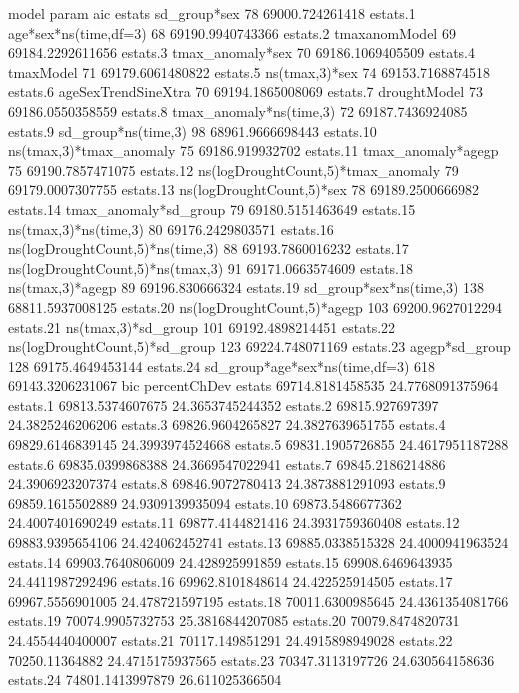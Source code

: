 \documentclass[a4paper]{article}                %
\begin{document}
\begin{Schunk}
\begin{Soutput}
                                       model param              aic
estats                          sd_group*sex    78  69000.724261418
estats.1               age*sex*ns(time,df=3)    68 69190.9940743366
estats.2                       tmaxanomModel    69 69184.2292611656
estats.3                    tmax_anomaly*sex    70 69186.1069405509
estats.4                           tmaxModel    71 69179.6061480822
estats.5                      ns(tmax,3)*sex    74 69153.7168874518
estats.6                 ageSexTrendSineXtra    70 69194.1865008069
estats.7                        droughtModel    73 69186.0550358559
estats.8             tmax_anomaly*ns(time,3)    72 69187.7436924085
estats.9                 sd_group*ns(time,3)    98 68961.9666698443
estats.10            ns(tmax,3)*tmax_anomaly    75  69186.919932702
estats.11                 tmax_anomaly*agegp    75 69190.7857471075
estats.12 ns(logDroughtCount,5)*tmax_anomaly    79 69179.0007307755
estats.13          ns(logDroughtCount,5)*sex    78 69189.2500666982
estats.14              tmax_anomaly*sd_group    79 69180.5151463649
estats.15              ns(tmax,3)*ns(time,3)    80 69176.2429803571
estats.16   ns(logDroughtCount,5)*ns(time,3)    88 69193.7860016232
estats.17   ns(logDroughtCount,5)*ns(tmax,3)    91 69171.0663574609
estats.18                   ns(tmax,3)*agegp    89  69196.830666324
estats.19            sd_group*sex*ns(time,3)   138 68811.5937008125
estats.20        ns(logDroughtCount,5)*agegp   103 69200.9627012294
estats.21                ns(tmax,3)*sd_group   101 69192.4898214451
estats.22     ns(logDroughtCount,5)*sd_group   123  69224.748071169
estats.23                     agegp*sd_group   128 69175.4649453144
estats.24     sd_group*age*sex*ns(time,df=3)   618 69143.3206231067
                       bic     percentChDev
estats    69714.8181458535 24.7768091375964
estats.1  69813.5374607675 24.3653745244352
estats.2   69815.927697397 24.3825246206206
estats.3  69826.9604265827 24.3827639651755
estats.4  69829.6146839145 24.3993974524668
estats.5  69831.1905726855 24.4617951187288
estats.6  69835.0399868388 24.3669547022941
estats.7  69845.2186214886 24.3906923207374
estats.8  69846.9072780413 24.3873881291093
estats.9  69859.1615502889 24.9309139935094
estats.10 69873.5486677362 24.4007401690249
estats.11 69877.4144821416 24.3931759360408
estats.12 69883.9395654106  24.424062452741
estats.13 69885.0338515328 24.4000941963524
estats.14 69903.7640806009  24.428925991859
estats.15 69908.6469643935 24.4411987292496
estats.16 69962.8101848614  24.422525914505
estats.17 69967.5556901005  24.478721597195
estats.18 70011.6300985645 24.4361354081766
estats.19 70074.9905732753 25.3816844207085
estats.20 70079.8474820731 24.4554440400007
estats.21  70117.149851291 24.4915898949028
estats.22   70250.11364882 24.4715175937565
estats.23 70347.3113197726  24.630564158636
estats.24 74801.1413997879  26.611025366504
\end{Soutput}
\end{Schunk}
\end{document}
